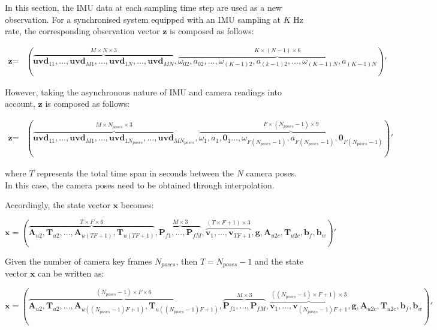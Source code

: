 \documentclass[12pt]{article}   %
\newcounter{case}
\begin{document}
In this section, the IMU data at each sampling time step are used as a new observation. For a synchronised system equipped with an IMU sampling at $K$ Hz rate, the corresponding observation vector $\textbf{z}$ is composed as follows:

\begin{align*}
\textbf{z}=&(\overbrace{\textbf{uvd}_{11}, ... , \textbf{uvd}_{M1}, ..., \textbf{uvd}_{1N}, ... , \textbf{uvd}_{MN}}^{M \times N \times 3}, \overbrace{\omega _{02}, a_{02}, ..., \omega _{(K-1)2}, a_{(k-1)2}, ..., \omega _{(K-1)N}, a_{(K-1)N}}^{K \times (N-1) \times 6})'
\end{align*}

However, taking the asynchronous nature of IMU and camera readings into account, $\textbf{z}$ is composed as follows:

\begin{align*}
\textbf{z}=&(\overbrace{\textbf{uvd}_{11}, ... , \textbf{uvd}_{M1}, ..., \textbf{uvd}_{1N_{poses}}, ... , \textbf{uvd}_{MN_{poses}}}^{M \times N_{poses} \times 3}, \overbrace{\omega _{1}, a_{1}, \textbf{0}_1..., \omega _{F(N_{poses}-1)}, a_{F(N_{poses}-1)},  \textbf{0}_{F(N_{poses}-1)}}^{F \times (N_{poses}-1) \times 9})'
\end{align*}

\noindent where $T$ represents the total time span in seconds between the $N$ camera poses. In this case, the camera poses need to be obtained through interpolation. 


Accordingly, the state vector $\textbf{x}$ becomes:

$$\textbf{x} = (\overbrace{\textbf{A}_{u2}, \textbf{T}_{u2}, ... , \textbf{A}_{u(TF+1)}, \textbf{T}_{u(TF+1)}}^{T \times F \times 6}, \overbrace{\textbf{P}_{f1}, ..., \textbf{P}_{fM}}^{M \times 3}, \overbrace{\textbf{v}_1, ..., \textbf{v}_{TF+1}}^{(T \times F + 1) \times 3},  \textbf{g}, \textbf{A}_{u2c}, \textbf{T}_{u2c}, \textbf{b}_f, \textbf{b}_w)' $$

Given the number of camera key frames $N_{poses}$, then $T = N_{poses}-1$ and the state vector $\textbf{x}$ can be written as:

$$\textbf{x} = (\overbrace{\textbf{A}_{u2}, \textbf{T}_{u2}, ... , \textbf{A}_{u((N_{poses}-1)F+1)}, \textbf{T}_{u((N_{poses}-1)F+1)}}^{(N_{poses}-1) \times F \times 6}, \overbrace{\textbf{P}_{f1}, ..., \textbf{P}_{fM}}^{M \times 3}, \overbrace{\textbf{v}_1, ..., \textbf{v}_{(N_{poses}-1)F+1}}^{((N_{poses}-1) \times F + 1) \times 3},  \textbf{g}, \textbf{A}_{u2c}, \textbf{T}_{u2c}, \textbf{b}_f, \textbf{b}_w)' $$
\end{document}

